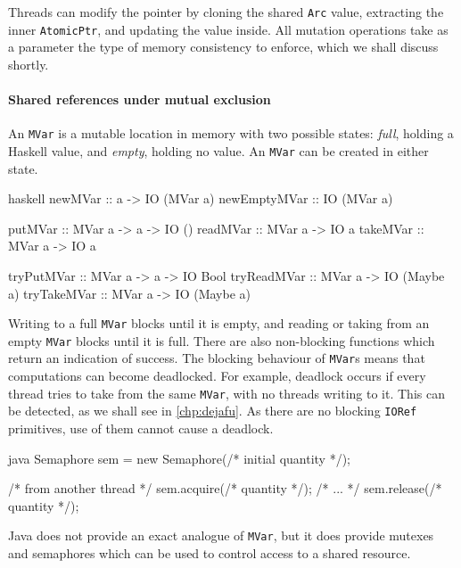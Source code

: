 Threads can modify the pointer by cloning the shared \verb|Arc| value,
extracting the inner \verb|AtomicPtr|, and updating the value inside.
All mutation operations take as a parameter the type of memory
consistency to enforce, which we shall discuss shortly.

\paragraph{Shared references under mutual exclusion}
An \verb|MVar| is a mutable location in memory with two possible
states: \emph{full}, holding a Haskell value, and \emph{empty},
holding no value.  An \verb|MVar| can be created in either state.

\begin{listing}
\centering
\begin{cminted}{haskell}
newMVar      :: a -> IO (MVar a)
newEmptyMVar :: IO (MVar a)

putMVar      :: MVar a -> a -> IO ()
readMVar     :: MVar a -> IO a
takeMVar     :: MVar a -> IO a

tryPutMVar   :: MVar a -> a -> IO Bool
tryReadMVar  :: MVar a -> IO (Maybe a)
tryTakeMVar  :: MVar a -> IO (Maybe a)
\end{cminted}
\caption{Mutual exclusion in Haskell.}\label{lst:mute_haskell}
\end{listing}

Writing to a full \verb|MVar| blocks until it is empty, and reading or
taking from an empty \verb|MVar| blocks until it is full.  There are
also non-blocking functions which return an indication of success.
The blocking behaviour of \verb|MVar|s means that computations can
become deadlocked.  For example, deadlock occurs if every thread tries
to take from the same \verb|MVar|, with no threads writing to it.
This can be detected, as we shall see in \cref{chp:dejafu}.  As there
are no blocking \verb|IORef| primitives, use of them cannot cause a
deadlock.

\begin{listing}
\centering
\begin{cminted}{java}
Semaphore sem = new Semaphore(/* initial quantity */);

/* from another thread */
sem.acquire(/* quantity */);
/* ... */
sem.release(/* quantity */);
\end{cminted}
\caption{Mutual exclusion in Java.}\label{lst:mute_java}
\end{listing}

Java does not provide an exact analogue of \verb|MVar|, but it does
provide mutexes and semaphores which can be used to control access to
a shared resource.

